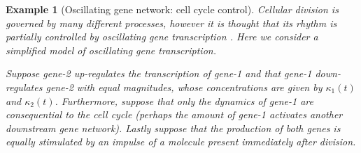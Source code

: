 \documentclass{article}
\newcommand{\1}{\mathbbm{1}}
\newtheorem{example}{Example}
\begin{document}
 \begin{example}[Oscillating gene network: cell cycle control]\label{ex:oscillator}
    Cellular division is governed by many different processes, however it is thought that its rhythm is partially controlled by oscillating gene transcription \citep{orlando2008global}. Here we consider a simplified model of oscillating gene transcription.

    Suppose gene-2 up-regulates the transcription of gene-1 and that gene-1 down-regulates gene-2 with equal magnitudes, whose concentrations are given by $\kappa_1(t)$ and $\kappa_2(t)$. Furthermore, suppose that only the dynamics of gene-1 are consequential to the cell cycle (perhaps the amount of gene-1 activates another downstream gene network). Lastly suppose that the production of both genes is equally stimulated by an impulse of a molecule present immediately after division.


\end{example}
\end{document}
